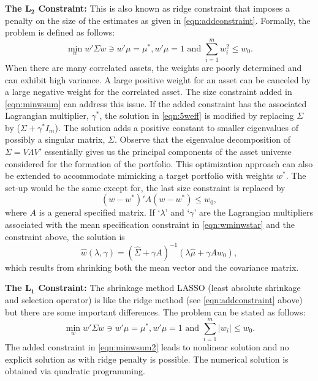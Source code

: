 \noindent\textbf{The $\mathbf{L_2}$ Constraint:} This is also known as ridge constraint that imposes a penalty on the size of the estimates as given in \eqref{eqn:addconstraint}. Formally, the problem is defined as follows:
	\begin{equation} \label{eqn:minwsum}
	\min_w w' \Sigma w \ni w' \mu= \mu^*, w'\mu= 1 \text{ and }\sum_{i=1}^m w_i^2 \leq w_0.
	\end{equation}
When there are many correlated assets, the weights are poorly determined and can exhibit high variance. A large positive weight for an asset can be canceled by a large negative weight for the correlated asset. The size constraint added in \eqref{eqn:minwsum} can address this issue. If the added constraint has the associated Lagrangian multiplier, $\gamma^*$, the solution in \eqref{eqn:5weff} is modified by replacing $\Sigma$ by ($\Sigma + \gamma^* I_m$). The solution adds a positive constant to smaller eigenvalues of possibly a singular matrix, $\Sigma$. Observe that the eigenvalue decomposition of $\Sigma= V \Lambda V'$ essentially gives us the principal components of the asset universe considered for the formation of the portfolio. This optimization approach can also be extended to accommodate mimicking a target portfolio with weights $w^*$. The set-up would be the same except for, the last size constraint is replaced by
	\begin{equation} \label{eqn:wminwstar}
	(w - w^*)' A(w - w^*) \leq w_0,
	\end{equation}
where $A$ is a general specified matrix. If `$\lambda$' and `$\gamma$' are the Lagrangian multipliers associated with the mean specification constraint in \eqref{eqn:wminwstar} and the constraint above, the solution is
	\begin{equation} \label{eqn:hatwlambdagamma}
	\hat{w}(\lambda,\gamma)= (\hat{\Sigma} + \gamma A)^{-1} (\lambda \hat{\mu} + \gamma A w_0),
	\end{equation}
which results from shrinking both the mean vector and the covariance matrix. \twomedskip


\noindent\textbf{The $\mathbf{L_1}$ Constraint:} The shrinkage method LASSO (least absolute shrinkage and selection operator) is like the ridge method (see \eqref{eqn:addconstraint} above) but there are some important differences. The problem can be stated as follows:
	\begin{equation} \label{eqn:minwsum2}
	\min_w w' \Sigma w \ni w'\mu=\mu^*, w'\mu=1 \text{ and } \sum_{i=1}^m |w_i| \leq w_0.
	\end{equation}
The added constraint in \eqref{eqn:minwsum2} leads to nonlinear solution and no explicit solution as with ridge penalty is possible. The numerical solution is obtained via quadratic programming.


